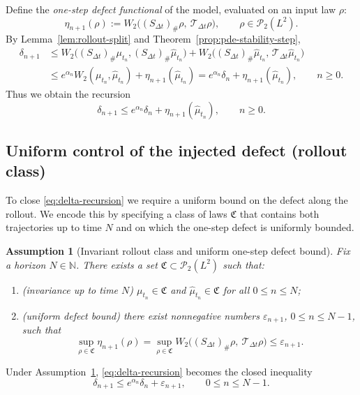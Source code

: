 \documentclass{article}
\numberwithin{equation}{section}
\theoremstyle{plain}
\newtheorem{assumption}[theorem]{Assumption}
\theoremstyle{definition}
\theoremstyle{remark}
\newcommand{\N}{\mathbb{N}}
\newcommand{\Pcal}{\mathcal{P}}
\begin{document}
Define the \emph{one-step defect functional} of the model, evaluated on an input law $\rho$:
\[
\eta_{n+1}(\rho)
:=
W_2\big((S_{\Delta t})_\#\rho,\ \mathcal T_{\Delta t}\rho\big),
\qquad \rho\in\Pcal_2(L^2).
\]
By Lemma~\ref{lem:rollout-split} and Theorem~\ref{prop:pde-stability-step},
\begin{align*}
\delta_{n+1}
&\le
W_2\big((S_{\Delta t})_\#\mu_{t_n},(S_{\Delta t})_\#\widehat\mu_{t_n}\big)
+
W_2\big((S_{\Delta t})_\#\widehat\mu_{t_n},\,\mathcal T_{\Delta t}\widehat\mu_{t_n}\big) \\
&\le e^{\alpha_n}W_2(\mu_{t_n},\widehat\mu_{t_n}) + \eta_{n+1}(\widehat\mu_{t_n})
= e^{\alpha_n}\delta_n + \eta_{n+1}(\widehat\mu_{t_n}),
\qquad n\ge 0.
\end{align*}
Thus we obtain the recursion
\begin{equation}\label{eq:delta-recursion}
\delta_{n+1}\le e^{\alpha_n}\delta_n + \eta_{n+1}(\widehat\mu_{t_n}),
\qquad n\ge 0.
\end{equation}

\subsection{Uniform control of the injected defect (rollout class)}

To close \eqref{eq:delta-recursion} we require a uniform bound on the defect along the rollout.
We encode this by specifying a class of laws $\mathfrak C$ that contains both trajectories up to time $N$
and on which the one-step defect is uniformly bounded.

\begin{assumption}[Invariant rollout class and uniform one-step defect bound]
\label{ass:rollout-class}
Fix a horizon $N\in\N$. There exists a set $\mathfrak C\subset\Pcal_2(L^2)$ such that:
\begin{enumerate}[label=(\roman*),leftmargin=2.2em]
\item (\emph{invariance up to time $N$}) $\mu_{t_n}\in\mathfrak C$ and $\widehat\mu_{t_n}\in\mathfrak C$
for all $0\le n\le N$;
\item (\emph{uniform defect bound}) there exist nonnegative numbers $\varepsilon_{n+1}$, $0\le n\le N-1$, such that
\[
\sup_{\rho\in\mathfrak C}\eta_{n+1}(\rho)
=
\sup_{\rho\in\mathfrak C}W_2\big((S_{\Delta t})_\#\rho,\ \mathcal T_{\Delta t}\rho\big)
\le \varepsilon_{n+1}.
\]
\end{enumerate}
\end{assumption}

Under Assumption~\ref{ass:rollout-class}, \eqref{eq:delta-recursion} becomes the closed inequality
\begin{equation}\label{eq:closed-recursion}
\delta_{n+1}\le e^{\alpha_n}\delta_n + \varepsilon_{n+1},
\qquad 0\le n\le N-1.
\end{equation}
\end{document}
